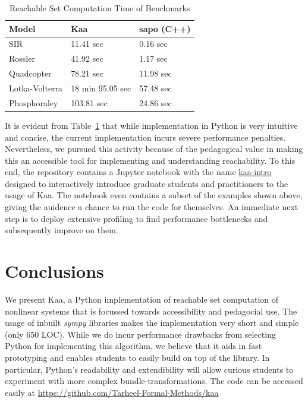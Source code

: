 \documentclass[EPiC]{easychair}
\begin{document}
\begin{table}[h]
\centering
\caption{Reachable Set Computation Time of Benchmarks}\label{tab:one}
\begin{tabular}{|l|l|l|}
\hline
Model & Kaa & sapo (C++)\\
\hline
SIR &  11.41 sec & 0.16 sec\\
\hline
Rossler &  41.92 sec & 1.17 sec\\
\hline
Quadcopter & 78.21 sec & 11.98 sec \\
\hline
Lotka-Volterra & 18 min 95.05 sec  & 57.48 sec\\
 \hline
 Phosphoraley & 103.81 sec & 24.86 sec \\
\hline
\end{tabular}
\end{table}

\noindent It is evident from Table~\ref{tab:one} that while implementation in Python is very intuitive and concise, the current implementation incurs severe performance penalties. 
%
Nevertheless, we pursued this activity because of the pedagogical value in making this an accessible tool for implementing and understanding reachability. To this end, the repository contains a Jupyter notebook with the name \href{https://github.com/Tarheel-Formal-Methods/kaa/blob/master/kaa-intro.ipynb}{kaa-intro} designed to interactively introduce graduate students and practitioners to the usage of Kaa. The notebook even contains a subset of the examples shown above, giving the auidence a chance to run the code for themselves. An immediate next step is to deploy extensive profiling to find performance bottlenecks and subsequently improve on them. 

\section{Conclusions}

We present Kaa, a Python implementation of reachable set computation of nonlinear systems that is focussed towards accessibility and pedagocial use.
%
The usage of inbuilt \emph{sympy} libraries makes the implementation very short and simple (only 650 LOC).
%
While we do incur performance drawbacks from selecting Python for implementing this algorithm, we believe that it aids in fast prototyping and enables students to easily build on top of the library. In particular, Python's readability and extendibility will allow curious students to experiment with more complex bundle-transformations. 
%
The code can be accessed easily at \url{https://github.com/Tarheel-Formal-Methods/kaa}
\end{document}
